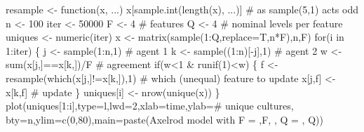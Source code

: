\documentclass[
  a4paper,
  DIV=11,
  numbers=noendperiod,
  oneside]{scrreprt}
\newenvironment{Shaded}{\begin{snugshade}}{\end{snugshade}}
\newcommand{\AttributeTok}[1]{\textcolor[rgb]{0.40,0.45,0.13}{#1}}
\newcommand{\CommentTok}[1]{\textcolor[rgb]{0.37,0.37,0.37}{#1}}
\newcommand{\ControlFlowTok}[1]{\textcolor[rgb]{0.00,0.23,0.31}{#1}}
\newcommand{\DecValTok}[1]{\textcolor[rgb]{0.68,0.00,0.00}{#1}}
\newcommand{\FunctionTok}[1]{\textcolor[rgb]{0.28,0.35,0.67}{#1}}
\newcommand{\NormalTok}[1]{\textcolor[rgb]{0.00,0.23,0.31}{#1}}
\newcommand{\OtherTok}[1]{\textcolor[rgb]{0.00,0.23,0.31}{#1}}
\newcommand{\SpecialCharTok}[1]{\textcolor[rgb]{0.37,0.37,0.37}{#1}}
\newcommand{\StringTok}[1]{\textcolor[rgb]{0.13,0.47,0.30}{#1}}
\begin{document}
\begin{Shaded}
\begin{Highlighting}[]
\NormalTok{resample }\OtherTok{\textless{}{-}} \ControlFlowTok{function}\NormalTok{(x, ...) x[}\FunctionTok{sample.int}\NormalTok{(}\FunctionTok{length}\NormalTok{(x), ...)] }\CommentTok{\# as sample(5,1) acts odd}
\NormalTok{n }\OtherTok{\textless{}{-}} \DecValTok{100}
\NormalTok{iter }\OtherTok{\textless{}{-}} \DecValTok{50000}
\NormalTok{F }\OtherTok{\textless{}{-}} \DecValTok{4} \CommentTok{\# features}
\NormalTok{Q }\OtherTok{\textless{}{-}} \DecValTok{4} \CommentTok{\# nominal levels per feature}
\NormalTok{uniques }\OtherTok{\textless{}{-}} \FunctionTok{numeric}\NormalTok{(iter)}
\NormalTok{x }\OtherTok{\textless{}{-}} \FunctionTok{matrix}\NormalTok{(}\FunctionTok{sample}\NormalTok{(}\DecValTok{1}\SpecialCharTok{:}\NormalTok{Q,}\AttributeTok{replace=}\NormalTok{T,n}\SpecialCharTok{*}\NormalTok{F),n,F)}
\ControlFlowTok{for}\NormalTok{(i }\ControlFlowTok{in} \DecValTok{1}\SpecialCharTok{:}\NormalTok{iter)}
\NormalTok{\{}
\NormalTok{  j }\OtherTok{\textless{}{-}} \FunctionTok{sample}\NormalTok{(}\DecValTok{1}\SpecialCharTok{:}\NormalTok{n,}\DecValTok{1}\NormalTok{)       }\CommentTok{\# agent 1}
\NormalTok{  k }\OtherTok{\textless{}{-}} \FunctionTok{sample}\NormalTok{((}\DecValTok{1}\SpecialCharTok{:}\NormalTok{n)[}\SpecialCharTok{{-}}\NormalTok{j],}\DecValTok{1}\NormalTok{) }\CommentTok{\# agent 2}
\NormalTok{  w }\OtherTok{\textless{}{-}} \FunctionTok{sum}\NormalTok{(x[j,]}\SpecialCharTok{==}\NormalTok{x[k,])}\SpecialCharTok{/}\NormalTok{F }\CommentTok{\# agreement}
  \ControlFlowTok{if}\NormalTok{(w}\SpecialCharTok{\textless{}}\DecValTok{1} \SpecialCharTok{\&} \FunctionTok{runif}\NormalTok{(}\DecValTok{1}\NormalTok{)}\SpecialCharTok{\textless{}}\NormalTok{w) \{}
\NormalTok{    f }\OtherTok{\textless{}{-}} \FunctionTok{resample}\NormalTok{(}\FunctionTok{which}\NormalTok{(x[j,]}\SpecialCharTok{!=}\NormalTok{x[k,]),}\DecValTok{1}\NormalTok{) }\CommentTok{\# which (unequal) feature to update}
\NormalTok{    x[j,f] }\OtherTok{\textless{}{-}}\NormalTok{ x[k,f] }\CommentTok{\# update}
\NormalTok{    \}}
\NormalTok{  uniques[i] }\OtherTok{\textless{}{-}} \FunctionTok{nrow}\NormalTok{(}\FunctionTok{unique}\NormalTok{(x))}
\NormalTok{\}}
\FunctionTok{plot}\NormalTok{(uniques[}\DecValTok{1}\SpecialCharTok{:}\NormalTok{i],}\AttributeTok{type=}\StringTok{\textquotesingle{}l\textquotesingle{}}\NormalTok{,}\AttributeTok{lwd=}\DecValTok{2}\NormalTok{,}\AttributeTok{xlab=}\StringTok{\textquotesingle{}time\textquotesingle{}}\NormalTok{,}\AttributeTok{ylab=}\StringTok{\textquotesingle{}\# unique cultures\textquotesingle{}}\NormalTok{,}
     \AttributeTok{bty=}\StringTok{\textquotesingle{}n\textquotesingle{}}\NormalTok{,}\AttributeTok{ylim=}\FunctionTok{c}\NormalTok{(}\DecValTok{0}\NormalTok{,}\DecValTok{80}\NormalTok{),}\AttributeTok{main=}\FunctionTok{paste}\NormalTok{(}\StringTok{\textquotesingle{}Axelrod model with F = \textquotesingle{}}\NormalTok{,F, }\StringTok{\textquotesingle{}, Q = \textquotesingle{}}\NormalTok{, Q))}
\end{Highlighting}
\end{Shaded}
\end{document}
